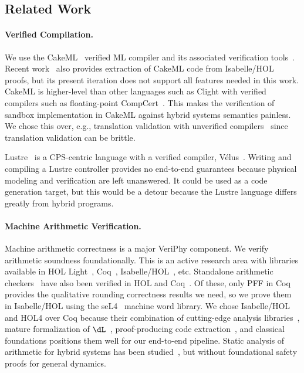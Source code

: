 \documentclass[12pt]{cmuthesis}
\theoremstyle{definition}
\theoremstyle{remark}
\newcommand{\Isabelle}{Isabelle/HOL\xspace}
\newcommand{\VeriPhy}{VeriPhy\xspace}
\begin{document}
\subsection{Related Work}
\paragraph{Verified Compilation.}
We use the CakeML~\cite{DBLP:conf/icfp/TanMKFON16} verified ML compiler and its associated verification tools~\cite{DBLP:conf/icfp/MyreenO12,DBLP:conf/esop/GueneauMKN17}.
Recent work~\cite{DBLP:conf/esop/HupelN18} also provides extraction of CakeML code from \Isabelle proofs, but its present iteration does not support all features needed in this work.
CakeML is higher-level than other languages such as Clight with verified compilers such as floating-point CompCert~\cite{DBLP:conf/arith/BoldoJLM13}.
This makes the verification of sandbox implementation in CakeML against hybrid systems semantics painless.
We chose this over, e.g., translation validation with unverified compilers~\cite{DBLP:conf/pldi/SewellMK13} since translation validation can be brittle.

Lustre~\cite{DBLP:journals/tse/HalbwachsLR92} is a CPS-centric language with a verified compiler, V\'{e}lus~\cite{DBLP:conf/pldi/BourkeBDLPR17}.
Writing and compiling a Lustre controller provides no end-to-end guarantees because physical modeling and verification are left unanswered.
It could be used as a code generation target, but this would be a detour because the Lustre language differs greatly from hybrid programs.

\paragraph{Machine Arithmetic Verification.}
Machine arithmetic correctness is a major \VeriPhy component.
We verify arithmetic soundness foundationally.
This is an active research area with libraries available in HOL Light~\cite{DBLP:conf/sfm/Harrison06}, Coq~\cite{DBLP:conf/arith/BoldoM10,DBLP:conf/tphol/DaumasRT01,DBLP:conf/mkm/BoldoFM09,DBLP:journals/iandc/Melquiond12}, \Isabelle~\cite{DBLP:journals/afp/Yu13}, etc.
Standalone arithmetic checkers~\cite{DBLP:conf/tacas/2018-1} have also been verified in HOL and Coq~\cite{DBLP:conf/fmcad/BeckerZMDMF18}.
Of these, only PFF in Coq~\cite{DBLP:conf/tphol/DaumasRT01} provides the qualitative rounding correctness results we need, so we prove them in \Isabelle using the seL4~\cite{DBLP:journals/cacm/KleinAEHCDEEKNSTW10} machine word library.
We chose \Isabelle and HOL4 over Coq because their combination of cutting-edge analysis libraries~\cite{DBLP:conf/itp/ImmlerT16}, mature formalization of $\dL$~\cite{DBLP:conf/cpp/BohrerRVVP17}, proof-producing code extraction~\cite{DBLP:conf/icfp/MyreenO12}, and classical foundations positions them well for our end-to-end pipeline.
Static analysis of arithmetic for hybrid systems has been studied~\cite{DBLP:conf/emsoft/MartinezMST10,DBLP:conf/emsoft/MajumdarSZ12,DBLP:conf/cav/BouissouGPTV09}, but without foundational safety proofs for general dynamics.
\end{document}
